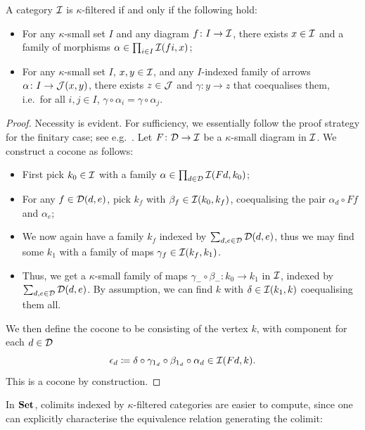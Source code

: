 \begin{lemma}\label{lem:concretefilter}
  A category $\mathcal{I}$ is $\kappa$-filtered if and only if the following hold:
  \begin{itemize}
    \item For any $\kappa$-small set $I$ and any diagram $f \colon I \to \mathcal{I}$, there exists $x\in\mathcal{I}$ and a family of morphisms $\alpha \in \prod_{i\in I}\mathcal{I}(fi,x)$;
    \item For any $\kappa$-small set $I$, $x,y\in\mathcal{I}$, and any $I$-indexed family of arrows $\alpha \colon I \to \mathcal{J}(x,y)$, there exists $z\in\mathcal{J}$ and $\gamma \colon y \to z$ that coequalises them, i.e.\ for all $i,j\in I$, $\gamma \circ \alpha_i = \gamma \circ \alpha_j$.
  \end{itemize}
\end{lemma}
\begin{proof}
  Necessity is evident. For sufficiency, we essentially follow the proof strategy for the finitary case; see e.g.~\citet[Lem. 2.13.2]{borceux1994handbookI}. Let $F \colon \mathcal{D} \to \mathcal{I}$ be a $\kappa$-small diagram in $\mathcal{I}$. We construct a cocone as follows: 
  \begin{itemize}
    \item First pick $k_0 \in \mathcal{I}$ with a family $\alpha \in \prod_{d\in\mathcal{D}}{\mathcal{I}}(Fd,k_0)$;
    \item For any $f \in {\mathcal{D}}(d,e)$, pick $k_f$ with $\beta_f \in {\mathcal{I}}(k_0,k_f)$, coequalising the pair $\alpha_d \circ Ff$ and $\alpha_e$;
    \item We now again have a family $k_f$ indexed by $\sum_{d,e\in\mathcal{D}}{\mathcal{D}}(d,e)$, thus we may find some $k_1$ with a family of maps $\gamma_f \in {\mathcal{I}}(k_f,k_1)$.
    \item Thus, we get a $\kappa$-small family of maps $\gamma_-\circ\beta_- \colon k_0 \to k_1$ in $\mathcal{I}$, indexed by $\sum_{d,e\in\mathcal{D}}{\mathcal{D}}(d,e)$. By assumption, we can find $k$ with $\delta \in {\mathcal{I}}(k_1,k)$ coequalising them all.
  \end{itemize}
  We then define the cocone to be consisting of the vertex $k$, with component for each $d\in\mathcal{D}$
  \[ \epsilon_d \coloneq \delta \circ \gamma_{1_d} \circ \beta_{1_d} \circ \alpha_d \in {\mathcal{I}}(Fd,k). \]
  This is a cocone by construction. 
\end{proof}

In $\mathbf{Set}$, colimits indexed by $\kappa$-filtered categories are easier to compute, since one can explicitly characterise the equivalence relation generating the colimit:

